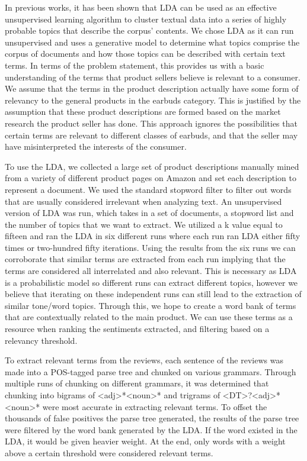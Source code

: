 \documentclass{article}
\begin{document}
In previous works, it has been shown that LDA can be used as an effective unsupervised learning algorithm to cluster textual data into a series of highly probable topics that describe the corpus' contents. We chose LDA as it can run unsupervised and uses a generative model to determine what topics comprise the corpus of documents and how those topics can be described with certain text terms. In terms of the problem statement, this provides us with a basic understanding of the terms that product sellers believe is relevant to a consumer. We assume that the terms in the product description actually have some form of relevancy to the general products in the earbuds category. This is justified by the assumption that these product descriptions are formed based on the market research the product seller has done. This approach ignores the possibilities that certain terms are relevant to different classes of earbuds, and that the seller may have misinterpreted the interests of the consumer.

To use the LDA,  we collected a large set of product descriptions manually mined from a variety of different product pages on Amazon and set each description to represent a document. We used the standard stopword filter to filter out words that are usually considered irrelevant when analyzing text. An unsupervised version of LDA was run, which takes in a set of documents, a stopword list and the number of topics that we want to extract. We utilized a k value equal to fifteen and ran the LDA in six different runs where each run ran LDA either fifty times or two-hundred fifty iterations. Using the results from the six runs we can corroborate that similar terms are extracted from each run implying that the terms are considered all interrelated and also relevant. This is necessary as LDA is a probabilistic model so different runs can extract different topics, however we believe that iterating on these independent runs can still lead to the extraction of similar tone/word topics. Through this, we hope to create a word bank of terms that are contextually related to the main product. We can use these terms as a resource when ranking the sentiments extracted, and filtering based on a relevancy threshold.  

To extract relevant terms from the reviews, each sentence of the reviews was made into a POS-tagged parse tree and chunked on various grammars. Through multiple runs of chunking on different grammars, it was determined that chunking into bigrams of <adj>*<noun>* and trigrams of <DT>?<adj>*<noun>* were most accurate in extracting relevant terms. To offset the thousands of false positives the parse tree generated, the results of the parse tree were filtered by the word bank generated by the LDA. If the word existed in the LDA, it would be given heavier weight. At the end, only words with a weight above a certain threshold were considered relevant terms. 
\end{document}
